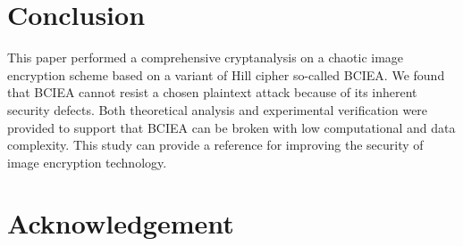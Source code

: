 \documentclass[final,3p,times]{elsarticle}
\begin{document}


\section{Conclusion}


This paper performed a comprehensive cryptanalysis on a chaotic image encryption scheme based on a variant of Hill cipher so-called BCIEA. We found that BCIEA cannot resist a chosen plaintext attack because of its inherent security defects. Both theoretical analysis and experimental verification were provided to support that BCIEA can be broken with low computational and data complexity. This study can provide a reference for improving the security of image encryption technology.


\section*{Acknowledgement}




\end{document}
